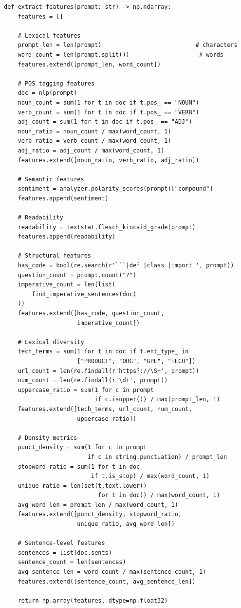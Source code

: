 \documentclass[oneside,12pt,a4paper]{report}
\begin{document}
\begin{lstlisting}[caption=Feature Extraction Algorithm]
def extract_features(prompt: str) -> np.ndarray:
    features = []
    
    # Lexical features
    prompt_len = len(prompt)                           # characters
    word_count = len(prompt.split())                    # words
    features.extend([prompt_len, word_count])
    
    # POS tagging features
    doc = nlp(prompt)
    noun_count = sum(1 for t in doc if t.pos_ == "NOUN")
    verb_count = sum(1 for t in doc if t.pos_ == "VERB")
    adj_count = sum(1 for t in doc if t.pos_ == "ADJ")
    noun_ratio = noun_count / max(word_count, 1)
    verb_ratio = verb_count / max(word_count, 1)
    adj_ratio = adj_count / max(word_count, 1)
    features.extend([noun_ratio, verb_ratio, adj_ratio])
    
    # Semantic features
    sentiment = analyzer.polarity_scores(prompt)["compound"]
    features.append(sentiment)
    
    # Readability
    readability = textstat.flesch_kincaid_grade(prompt)
    features.append(readability)
    
    # Structural features
    has_code = bool(re.search(r'```|def |class |import ', prompt))
    question_count = prompt.count("?")
    imperative_count = len(list(
        find_imperative_sentences(doc)
    ))
    features.extend([has_code, question_count, 
                     imperative_count])
    
    # Lexical diversity
    tech_terms = sum(1 for t in doc if t.ent_type_ in 
                     ["PRODUCT", "ORG", "GPE", "TECH"])
    url_count = len(re.findall(r'https?://\S+', prompt))
    num_count = len(re.findall(r'\d+', prompt))
    uppercase_ratio = sum(1 for c in prompt 
                          if c.isupper()) / max(prompt_len, 1)
    features.extend([tech_terms, url_count, num_count, 
                     uppercase_ratio])
    
    # Density metrics
    punct_density = sum(1 for c in prompt 
                        if c in string.punctuation) / prompt_len
    stopword_ratio = sum(1 for t in doc 
                         if t.is_stop) / max(word_count, 1)
    unique_ratio = len(set(t.text.lower() 
                           for t in doc)) / max(word_count, 1)
    avg_word_len = prompt_len / max(word_count, 1)
    features.extend([punct_density, stopword_ratio, 
                     unique_ratio, avg_word_len])
    
    # Sentence-level features
    sentences = list(doc.sents)
    sentence_count = len(sentences)
    avg_sentence_len = word_count / max(sentence_count, 1)
    features.extend([sentence_count, avg_sentence_len])
    
    return np.array(features, dtype=np.float32)
\end{lstlisting}
\end{document}
